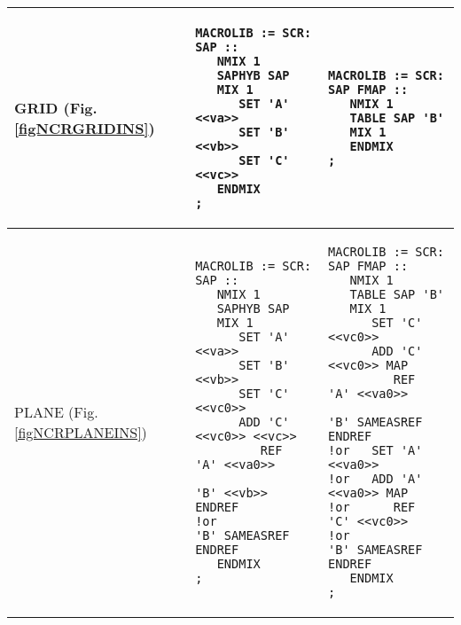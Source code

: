 \begin{center}
\tablelasttail{\hline}

\begin{supertabular}{|p{0.1\textwidth}|p{0.4\textwidth}|p{0.4\textwidth}|}
\hline
GRID (Fig. \ref{figNCRGRIDINS}) 
& \begin{verbatim}
MACROLIB := SCR: SAP ::
   NMIX 1 
   SAPHYB SAP
   MIX 1 
      SET 'A' <<va>>
      SET 'B' <<vb>>
      SET 'C' <<vc>>
   ENDMIX
;
\end{verbatim} 
& \begin{verbatim}
MACROLIB := SCR: SAP FMAP ::
   NMIX 1
   TABLE SAP 'B' 
   MIX 1 
   ENDMIX
;
\end{verbatim} \\
\hline
PLANE (Fig. \ref{figNCRPLANEINS}) & 
\begin{verbatim}
MACROLIB := SCR: SAP ::
   NMIX 1
   SAPHYB SAP
   MIX 1 
      SET 'A' <<va>>
      SET 'B' <<vb>>
      SET 'C' <<vc0>>
      ADD 'C' <<vc0>> <<vc>>
         REF  'A' <<va0>> 
              'B' <<vb>> ENDREF
!or           'B' SAMEASREF ENDREF
   ENDMIX
;
\end{verbatim} &
\begin{verbatim}
MACROLIB := SCR: SAP FMAP ::
   NMIX 1
   TABLE SAP 'B' 
   MIX 1 
      SET 'C' <<vc0>>
      ADD 'C' <<vc0>> MAP
         REF  'A' <<va0>> 
              'B' SAMEASREF ENDREF
!or   SET 'A' <<va0>>
!or   ADD 'A' <<va0>> MAP
!or      REF  'C' <<vc0>> 
!or           'B' SAMEASREF ENDREF
   ENDMIX
;
\end{verbatim} \\
\hline
%

\end{supertabular}
\end{center}
